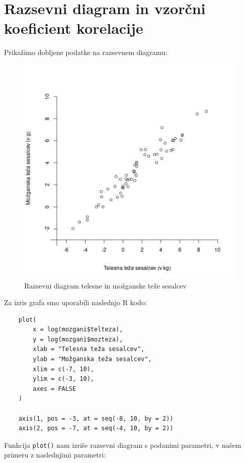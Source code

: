 \section{Razsevni diagram in vzorčni koeficient korelacije}\label{sec3}

Prikažimo dobljene podatke na razsevnem diagramu:

\begin{figure}[h]
    \centering
    \includegraphics[scale=0.5]{res/razsevni-diagram.png}
    \caption{Razsevni diagram telesne in možganske teže sesalcev}
    \label{img:razs-diag}
\end{figure}

\noindent
Za izris grafa smo uporabili naslednjo R kodo:

\begin{verbatim}
    plot(
        x = log(mozgani$telteza),
        y = log(mozgani$mozteza),
        xlab = "Telesna teža sesalcev",
        ylab = "Možganska teža sesalcev",
        xlim = c(-7, 10),
        ylim = c(-3, 10),
        axes = FALSE
    )

    axis(1, pos = -3, at = seq(-8, 10, by = 2))
    axis(2, pos = -7, at = seq(-4, 10, by = 2))
\end{verbatim}

\newpage
Funkcija \verb|plot()| nam izriše razsevni diagram s podanimi parametri, v našem primeru z naslednjimi parametri:


